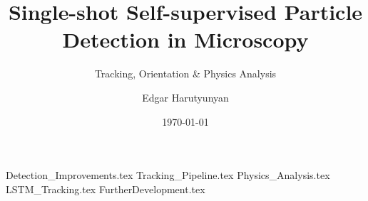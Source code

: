 \documentclass[aspectratio=\BeamerAspectRatio]{beamer}
\title[LodeSTAR Project]{Single-shot Self-supervised Particle Detection in Microscopy}
\subtitle[]{Tracking, Orientation \& Physics Analysis}
\author{Edgar Harutyunyan}
\institute
{Molecular Nanophotonics Group\\
Peter Debye Institute for Soft Matter Physics\\
Universit\"at Leipzig}
\date{\today}
\begin{document}
\maketitlepage
\maketableofcontents
\makesectionpopup

{Detection_Improvements.tex}
{Tracking_Pipeline.tex}
{Physics_Analysis.tex}
{LSTM_Tracking.tex}
{FurtherDevelopment.tex}
\end{document}
